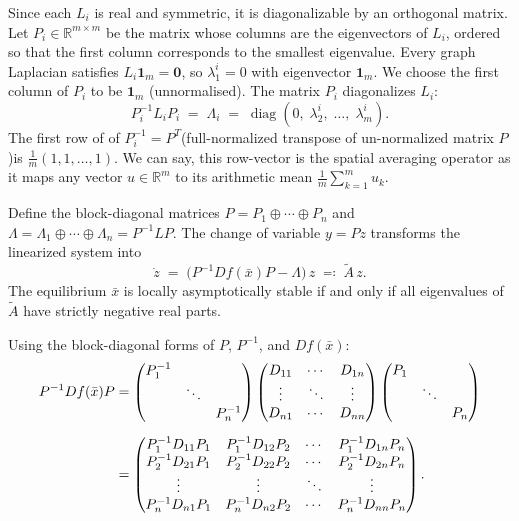 \documentclass[12pt,a4paper]{article}
\theoremstyle{definition}
\begin{document}
Since each \(L_i\) is real and symmetric, it is diagonalizable by an orthogonal matrix. Let \(P_i \in \mathbb{R}^{m \times m}\) be the matrix whose columns are the eigenvectors of \(L_i\), ordered so that the first column corresponds to the smallest eigenvalue. Every graph Laplacian satisfies \(L_i \mathbf{1}_m = \mathbf{0}\), so \(\lambda_1^i = 0\) with eigenvector \(\mathbf{1}_m\). We choose the first column of \(P_i\) to be \(\mathbf{1}_m\) (unnormalised). The matrix \(P_i\) diagonalizes \(L_i\):
\[
P_i^{-1} L_i P_i
\;=\;
\Lambda_i
\;=\;
\operatorname{diag}\!\left(
0,\; \lambda^i_2,\; \ldots,\; \lambda^i_m
\right).
\]
The first row of of \(P_i^{-1}=P^T\)(full-normalized transpose of un-normalized matrix \(P\) )is  \( \tfrac{1}{m}(1,1,\ldots,1)\).  We can say, this row-vector is the spatial averaging operator as it maps any vector \(u \in \mathbb{R}^m\) to its arithmetic mean \(\frac{1}{m}\sum_{k=1}^{m} u_k\).

Define the block-diagonal matrices \(P = P_1 \oplus \cdots \oplus P_n\) and \(\Lambda = \Lambda_1 \oplus \cdots \oplus \Lambda_n = P^{-1} L P\). The change of variable \(y = Pz\) transforms the linearized system into
\[
\dot{z}
\;=\;
\bigl(P^{-1}Df(\bar{x})P - \Lambda\bigr)\,z
\;\eqqcolon\;
\widetilde{A}\,z.
\]
The equilibrium \(\bar{x}\) is locally asymptotically stable if and only if all eigenvalues of \(\widetilde{A}\) have strictly negative real parts.

\noindent
Using the block-diagonal forms of $P$, $P^{-1}$, and $Df(\bar{x})$:
\begin{align*}
  P^{-1}Df(\bar{x})P
  &=
  \begin{pmatrix} P_1^{-1} & & \\ & \ddots & \\ & & P_n^{-1}
  \end{pmatrix}
  \begin{pmatrix} D_{11} & \cdots & D_{1n} \\
    \vdots & \ddots & \vdots \\
    D_{n1} & \cdots & D_{nn}
  \end{pmatrix}
  \begin{pmatrix} P_1 & & \\ & \ddots & \\ & & P_n \end{pmatrix}
  \notag\\[6pt]
  &=
  \begin{pmatrix}
    P_1^{-1}D_{11}P_1 & P_1^{-1}D_{12}P_2 & \cdots & P_1^{-1}D_{1n}P_n \\
    P_2^{-1}D_{21}P_1 & P_2^{-1}D_{22}P_2 & \cdots & P_2^{-1}D_{2n}P_n \\
    \vdots & \vdots & \ddots & \vdots \\
    P_n^{-1}D_{n1}P_1 & P_n^{-1}D_{n2}P_2 & \cdots & P_n^{-1}D_{nn}P_n
  \end{pmatrix}.
  \label{eq:PJP}
\end{align*}
\end{document}
